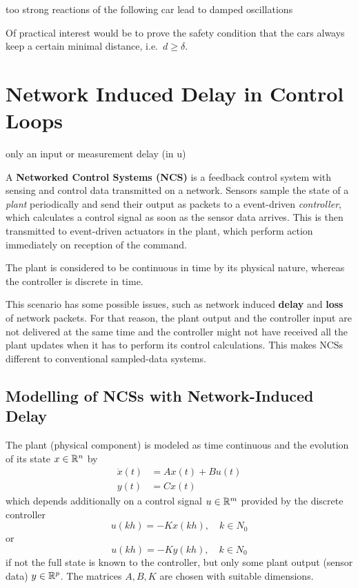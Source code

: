     too strong reactions of the following car lead to damped oscillations

    Of practical interest would be to prove the safety condition that the cars always keep a certain minimal distance, i.e.\ $d\geq\delta$.

\section{Network Induced Delay in Control Loops}

    only an input or measurement delay (in u)

    A \textbf{Networked Control Systems (NCS)} is a feedback control system with sensing and control data transmitted on a network.
    Sensors sample the state of a \textit{plant} periodically and send their output as packets to a event-driven \textit{controller}, which calculates a control signal as soon as the sensor data arrives. This is then transmitted to event-driven actuators in the plant, which perform action immediately on reception of the command.

    The plant is considered to be continuous in time by its physical nature, whereas the controller is discrete in time.

    This scenario has some possible issues, such as network induced \textbf{delay} and \textbf{loss} of network packets.
    For that reason, the plant output and the controller input are not delivered at the same time and the controller might not have received all the plant updates when it has to perform its control calculations. This makes NCSs different to conventional sampled-data systems.

    \subsection{Modelling of NCSs with Network-Induced Delay}
        The plant (physical component) is modeled as time continuous and the evolution of its state $x \in\mathbb{R}^{n}$ by
        \begin{align*}
            \dot{x}(t) &= Ax(t) + Bu(t) \\
            y(t) &= Cx(t)
        \end{align*}
        which depends additionally on a control signal $u \in\mathbb{R}^{m}$ provided by the discrete controller
        \begin{equation*}
            u(kh) = -Kx(kh),\quad k\in N_0
        \end{equation*} or \begin{equation*}
            u(kh) = -Ky(kh),\quad k\in N_0
        \end{equation*}
        if not the full state is known to the controller, but only some plant output (sensor data) $y \in\mathbb{R}^{p}$.
        The matrices $A, B, K$ are chosen with suitable dimensions. 

